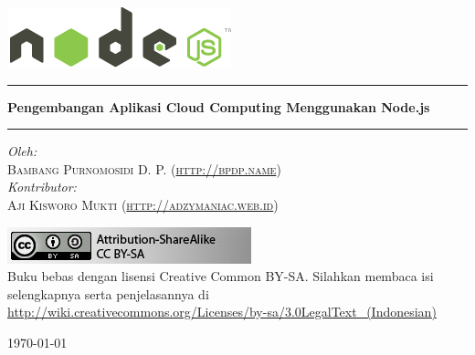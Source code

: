 \begin{titlepage}

\begin{center}

\includegraphics[scale=1]{images/logo-light.png}\\[1cm]

%

\hrule\vspace{5mm}
\noindent
{ \huge \bfseries Pengembangan Aplikasi Cloud Computing Menggunakan Node.js}\\[0.4cm]
\hrule\vspace{15mm}

\begin{center} \small
\emph{Oleh:}\\
\vspace{20mm}
\textsc{Bambang Purnomosidi D. P. (\url{http://bpdp.name})}\\
\emph{Kontributor:}\\
\textsc{Aji Kisworo Mukti (\url{http://adzymaniac.web.id})} 
\end{center}


\includegraphics[scale=1]{images/cc-by-sa.jpg}\\[1cm]

Buku bebas dengan lisensi Creative Common BY-SA. Silahkan membaca isi selengkapnya serta penjelasannya di \url{http://wiki.creativecommons.org/Licenses/by-sa/3.0LegalText_(Indonesian)}

\vfill

{\large \today}

\end{center}

\end{titlepage}
